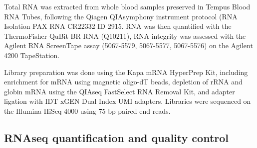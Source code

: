 \begin{outline}
%

Total RNA was extracted from whole blood samples preserved in Tempus Blood RNA Tubes, following the Qiagen QIAsymphony instrument protocol (RNA Isolation PAX RNA CR22332 ID 2915.
RNA was then quantified with the ThermoFisher QuBit BR RNA (Q10211), RNA integrity was assessed with the Agilent RNA ScreenTape assay (5067-5579, 5067-5577, 5067-5576) on the Agilent 4200 TapeStation.

Library preparation was done using the Kapa mRNA HyperPrep Kit, including enrichment for mRNA using magnetic oligo-dT beads, depletion of rRNA and globin mRNA using the QIAseq FastSelect RNA Removal Kit, and adapter ligation with IDT xGEN Dual Index UMI adapters.
Libraries were sequenced on the Illumina HiSeq 4000 using 75 bp paired-end reads.

\subsection{RNAseq quantification and quality control}


\end{outline}
